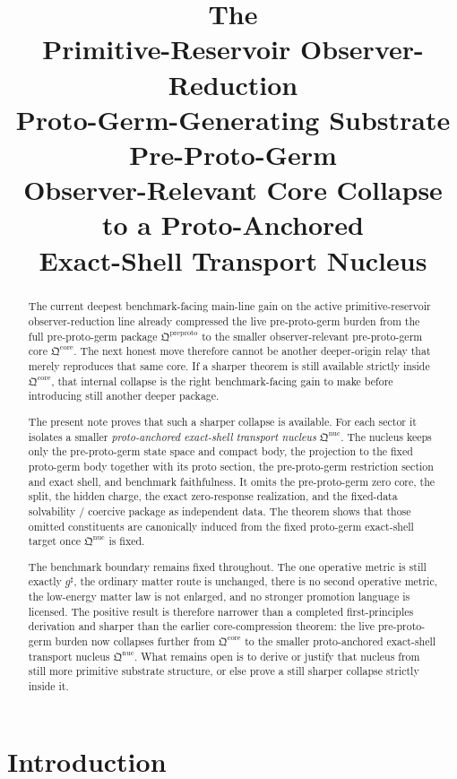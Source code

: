 \documentclass[11pt]{article}
\title{\textbf{The \TheoryName{}}\\[0.4em]
\large Primitive-Reservoir Observer-Reduction\\
\large Proto-Germ-Generating Substrate Pre-Proto-Germ\\
\large Observer-Relevant Core Collapse to a Proto-Anchored\\
\large Exact-Shell Transport Nucleus}
\author{}
\date{}
\newcommand{\CompletedMetric}{g^{\sharp}}
\newcommand{\PreProtoPackage}{\mathfrak Q^{\mathrm{preproto}}}
\newcommand{\PreProtoCore}{\mathfrak Q^{\mathrm{core}}}
\newcommand{\PreProtoNucleus}{\mathfrak Q^{\mathrm{nuc}}}
\begin{document}
\maketitle

\begin{abstract}
The current deepest benchmark-facing main-line gain on the active primitive-reservoir observer-reduction line already compressed the live pre-proto-germ burden from the full pre-proto-germ package \(\PreProtoPackage\) to the smaller observer-relevant pre-proto-germ core \(\PreProtoCore\). The next honest move therefore cannot be another deeper-origin relay that merely reproduces that same core. If a sharper theorem is still available strictly inside \(\PreProtoCore\), that internal collapse is the right benchmark-facing gain to make before introducing still another deeper package.

The present note proves that such a sharper collapse is available. For each sector it isolates a smaller \emph{proto-anchored exact-shell transport nucleus} \(\PreProtoNucleus\). The nucleus keeps only the pre-proto-germ state space and compact body, the projection to the fixed proto-germ body together with its proto section, the pre-proto-germ restriction section and exact shell, and benchmark faithfulness. It omits the pre-proto-germ zero core, the split, the hidden charge, the exact zero-response realization, and the fixed-data solvability / coercive package as independent data. The theorem shows that those omitted constituents are canonically induced from the fixed proto-germ exact-shell target once \(\PreProtoNucleus\) is fixed.

The benchmark boundary remains fixed throughout. The one operative metric is still exactly \(\CompletedMetric\), the ordinary matter route is unchanged, there is no second operative metric, the low-energy matter law is not enlarged, and no stronger promotion language is licensed. The positive result is therefore narrower than a completed first-principles derivation and sharper than the earlier core-compression theorem: the live pre-proto-germ burden now collapses further from \(\PreProtoCore\) to the smaller proto-anchored exact-shell transport nucleus \(\PreProtoNucleus\). What remains open is to derive or justify that nucleus from still more primitive substrate structure, or else prove a still sharper collapse strictly inside it.
\end{abstract}

\section{Introduction}
\end{document}
